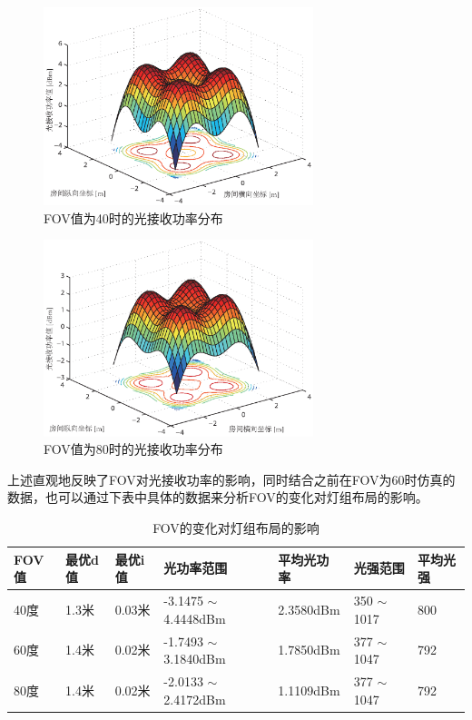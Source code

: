 \begin{figure}[htbp]
    \centering
	\includegraphics[width=0.7\textwidth]{figures/chapter-3/Fov40Power.eps}
	\caption{FOV值为40时的光接收功率分布}
	\label{fig:fov_40_power}
\end{figure}

\begin{figure}[htbp]
    \centering
	\includegraphics[width=0.7\textwidth]{figures/chapter-3/Fov80Power.eps}
	\caption{FOV值为80时的光接收功率分布}
	\label{fig:fov_80_power}
\end{figure}

上述直观地反映了FOV对光接收功率的影响，同时结合之前在FOV为60时仿真的数据，也可以通过下表中具体的数据来分析FOV的变化对灯组布局的影响。

\begin{table}[htbp]
    \caption{FOV的变化对灯组布局的影响}
    \label{tab:fov-vs-led-layout}
    \centering
    \begin{tabular}{lllllll}
        \toprule
        FOV值 & 最优d值 & 最优i值 & 光功率范围 & 平均光功率 & 光强范围 & 平均光强\\
        \midrule
        40度  & 1.3米  & 0.03米  & -3.1475 $\sim$ 4.4448dBm & 2.3580dBm & 350 $\sim$ 1017 & 800 \\
        60度  & 1.4米  & 0.02米  & -1.7493 $\sim$ 3.1840dBm & 1.7850dBm & 377 $\sim$ 1047 & 792 \\
        80度  & 1.4米  & 0.02米  & -2.0133 $\sim$ 2.4172dBm & 1.1109dBm & 377 $\sim$ 1047 & 792 \\
        \bottomrule
    \end{tabular}
\end{table}

